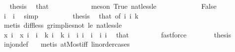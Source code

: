 \begin{isabellebody}
\ \isamarkupfalse%
\ {\isacharquery}{\kern0pt}thesis\ \isamarkupfalse%
\ that\ {\isacharasterisk}{\kern0pt}\ \isanewline
\ \ \ \ \ \ \ \ \isamarkupfalse%
\ {\isacharparenleft}{\kern0pt}meson\ True\ nat{\isacharunderscore}{\kern0pt}less{\isacharunderscore}{\kern0pt}le{\isacharparenright}{\kern0pt}\isanewline
\ \ \ \ \isamarkupfalse%
\isanewline
\ \ \ \ \ \ \isamarkupfalse%
\ False\isanewline
\ \ \ \ \ \ \isamarkupfalse%
\ \isamarkupfalse%
\ {\isachardoublequoteopen}i{}\ {\isacharless}{\kern0pt}\ i{}{\isachardoublequoteclose}\ \isamarkupfalse%
\ simp\isanewline
\ \ \ \ \ \ \isamarkupfalse%
\ \isamarkupfalse%
\ {\isacharquery}{\kern0pt}thesis\ \isamarkupfalse%
\ that\ {\isacharasterisk}{\kern0pt}{\isacharbrackleft}{\kern0pt}of\ i{}\ i{}{\isacharbrackright}{\kern0pt}\ {\isacartoucheopen}k\ {\isachargreater}{\kern0pt}\ {}{\isacartoucheclose}\ \ \isanewline
\ \ \ \ \ \ \ \ \isamarkupfalse%
\ {\isacharparenleft}{\kern0pt}metis\ diff{\isacharunderscore}{\kern0pt}less\ gr{\isacharunderscore}{\kern0pt}implies{\isacharunderscore}{\kern0pt}not{}\ le{}\ nat{\isacharunderscore}{\kern0pt}less{\isacharunderscore}{\kern0pt}le{\isacharparenright}{\kern0pt}\isanewline
\ \ \ \ \isamarkupfalse%
\isanewline
\ \ \ \ \isamarkupfalse%
\ \isamarkupfalse%
\ {\isachardoublequoteopen}x\ i{}\ {\isasymnoteq}\ x\ i{}{\isachardoublequoteclose}\ \ {\isachardoublequoteopen}i{}\ {\isasymle}\ k{\isachardoublequoteclose}\ {\isachardoublequoteopen}i{}\ {\isasymle}\ k{\isachardoublequoteclose}\ {\isachardoublequoteopen}i{}\ {\isasymnoteq}\ i{}{\isachardoublequoteclose}\ {\isachardoublequoteopen}i{}\ {\isacharless}{\kern0pt}\ i{}{\isachardoublequoteclose}\ \ i{}\ i{}\ \isamarkupfalse%
\ that\ \isanewline
\ \ \ \ \ \ \isamarkupfalse%
\ fastforce\isanewline
\ \ \ \ \isamarkupfalse%
\ \isamarkupfalse%
\ {\isacharquery}{\kern0pt}thesis\ \isamarkupfalse%
\ inj{\isacharunderscore}{\kern0pt}on{\isacharunderscore}{\kern0pt}def\ \ \isamarkupfalse%
\ {\isacharparenleft}{\kern0pt}metis\ atMost{\isacharunderscore}{\kern0pt}iff\ linorder{\isacharunderscore}{\kern0pt}cases{\isacharparenright}{\kern0pt}\isanewline

\end{isabellebody}
